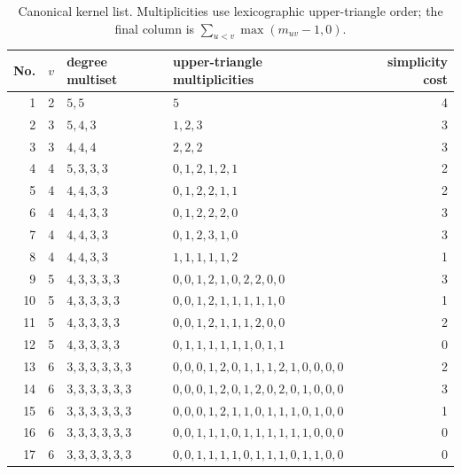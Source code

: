 \documentclass[11pt]{article}
\theoremstyle{remark}
\begin{document}
\begin{table}[p]
\centering\small
\begin{tabular}{r r l l r}
\toprule
No.&$v$&degree multiset&upper-triangle multiplicities&simplicity cost\\
\midrule
1&2&$5,5$&$5$&4\\
2&3&$5,4,3$&$1,2,3$&3\\
3&3&$4,4,4$&$2,2,2$&3\\
4&4&$5,3,3,3$&$0,1,2,1,2,1$&2\\
5&4&$4,4,3,3$&$0,1,2,2,1,1$&2\\
6&4&$4,4,3,3$&$0,1,2,2,2,0$&3\\
7&4&$4,4,3,3$&$0,1,2,3,1,0$&3\\
8&4&$4,4,3,3$&$1,1,1,1,1,2$&1\\
9&5&$4,3,3,3,3$&$0,0,1,2,1,0,2,2,0,0$&3\\
10&5&$4,3,3,3,3$&$0,0,1,2,1,1,1,1,1,0$&1\\
11&5&$4,3,3,3,3$&$0,0,1,2,1,1,1,2,0,0$&2\\
12&5&$4,3,3,3,3$&$0,1,1,1,1,1,1,0,1,1$&0\\
13&6&$3,3,3,3,3,3$&$0,0,0,1,2,0,1,1,1,2,1,0,0,0,0$&2\\
14&6&$3,3,3,3,3,3$&$0,0,0,1,2,0,1,2,0,2,0,1,0,0,0$&3\\
15&6&$3,3,3,3,3,3$&$0,0,0,1,2,1,1,0,1,1,1,0,1,0,0$&1\\
16&6&$3,3,3,3,3,3$&$0,0,1,1,1,0,1,1,1,1,1,1,0,0,0$&0\\
17&6&$3,3,3,3,3,3$&$0,0,1,1,1,1,0,1,1,1,0,1,1,0,0$&0\\
\bottomrule
\end{tabular}
\caption{Canonical kernel list.  Multiplicities use lexicographic
upper-triangle order; the final column is
$\sum_{u<v}\max(m_{uv}-1,0)$.}\label{tab:kernels}
\end{table}
\end{document}
